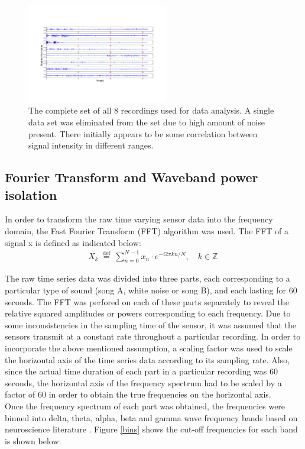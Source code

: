 \documentclass[twocolumn,superscriptaddress]{revtex4-1}
\theoremstyle{definition}
\theoremstyle{remark}
\begin{document}
\begin{figure}[h!]
  \centering     
   \includegraphics[width=0.55\textwidth]{all_waves}
  \caption{\label{datata}The complete set of all 8 recordings used for data analysis. A single data set was eliminated from the set due to high amount of noise present. There initially appears to be some correlation between signal intensity in different ranges.}
\end{figure}



\subsection{Fourier Transform and Waveband power isolation}

In order to transform the raw time varying sensor data into the frequency domain, the Fast Fourier Transform (FFT) algorithm was used. The FFT of a signal x is defined as indicated below:
\begin{align}
X_k\ \stackrel{\text{def}}{=}\ \sum_{n=0}^{N-1} x_n \cdot e^{-i 2 \pi k n / N},  \quad k\in\mathbb{Z}\,
\end{align}

The raw time series data was divided into three parts, each corresponding to a particular type of sound (song A, white noise or song B), and each lasting for 60 seconds. The FFT was perfored on each of these parts separately to reveal the relative squared amplitudes or powers corresponding to each frequency.  Due to some inconsistencies in the sampling time of the sensor, it was assumed that the sensors transmit at a constant rate throughout a particular recording. In order to incorporate the above mentioned assumption, a scaling factor was used to scale the horizontal axis of the time series data according to its sampling rate. Also, since the actual time duration of each part in a particular recording was 60 seconds, the horizontal axis of the frequency spectrum had to be scaled by a factor of 60 in order to obtain the true frequencies on the horizontal axis. \\
Once the frequency spectrum of each part was obtained, the frequencies were binned into delta, theta, alpha, beta and gamma wave frequency bands based on neuroscience literature \cite{thommen}. Figure \ref{bins} shows the cut-off frequencies for each band is shown below:     
\end{document}

